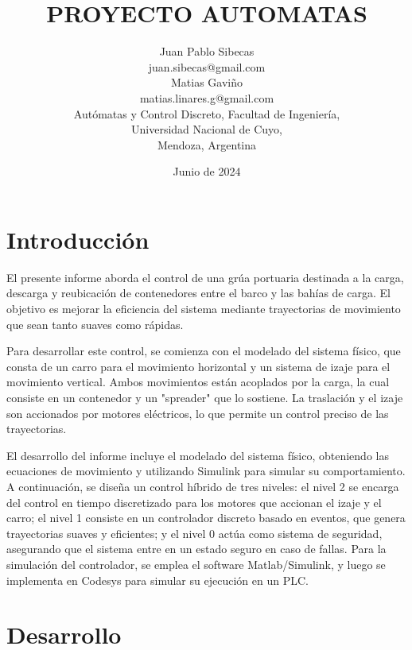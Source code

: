 \documentclass{article}
\title{PROYECTO AUTOMATAS}
\author{Juan Pablo Sibecas \\ juan.sibecas@gmail.com \\Matias Gaviño\\ matias.linares.g@gmail.com \\ Autómatas y Control Discreto, Facultad de Ingeniería, \\ Universidad Nacional de Cuyo, \\ Mendoza, Argentina}
\date{Junio de 2024}
\begin{document}
\renewcommand{\tablename}{Tabla}

\maketitle

\begin{abstract}\label{sec:abstract}

\end{abstract}

\newpage

\section{Introducción} \label{sec:intro}


El presente informe aborda el control de una grúa portuaria destinada a la carga, descarga y reubicación de contenedores entre el barco y las bahías de carga. El objetivo es mejorar la eficiencia del sistema mediante trayectorias de movimiento que sean tanto suaves como rápidas.

Para desarrollar este control, se comienza con el modelado del sistema físico, que consta de un carro para el movimiento horizontal y un sistema de izaje para el movimiento vertical. Ambos movimientos están acoplados por la carga, la cual consiste en un contenedor y un "spreader" que lo sostiene. La traslación y el izaje son accionados por motores eléctricos, lo que permite un control preciso de las trayectorias.

El desarrollo del informe incluye el modelado del sistema físico, obteniendo las ecuaciones de movimiento y utilizando Simulink para simular su comportamiento. A continuación, se diseña un control híbrido de tres niveles: el nivel 2 se encarga del control en tiempo discretizado para los motores que accionan el izaje y el carro; el nivel 1 consiste en un controlador discreto basado en eventos, que genera trayectorias suaves y eficientes; y el nivel 0 actúa como sistema de seguridad, asegurando que el sistema entre en un estado seguro en caso de fallas. Para la simulación del controlador, se emplea el software Matlab/Simulink, y luego se implementa en Codesys para simular su ejecución en un PLC.


\section{Desarrollo} \label{sec:desarrollo}
\end{document}
